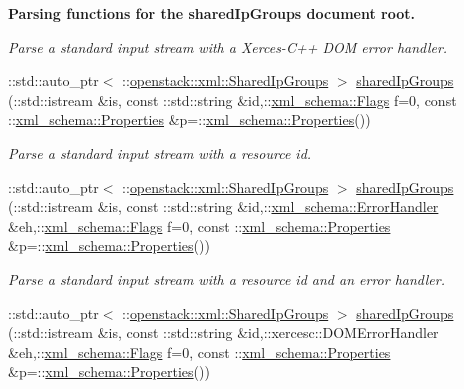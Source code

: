 \begin{Indent}{\bf Parsing functions for the sharedIpGroups document root.}
\begin{DoxyCompactItemize}
\begin{DoxyCompactList}\small\item\em Parse a standard input stream with a Xerces-\/C++ DOM error handler. \item\end{DoxyCompactList}\item 
::std::auto\_\-ptr$<$ ::\hyperlink{classopenstack_1_1xml_1_1SharedIpGroups}{openstack::xml::SharedIpGroups} $>$ \hyperlink{namespaceopenstack_1_1xml_adf667d4ebcb1ed4aa061b80aff868b9d}{sharedIpGroups} (::std::istream \&is, const ::std::string \&id,::\hyperlink{namespacexml__schema_affb4c227cbd9aa7453dd1dc5a1401943}{xml\_\-schema::Flags} f=0, const ::\hyperlink{namespacexml__schema_ad27ce19a7ee1d3b1064092648898f64c}{xml\_\-schema::Properties} \&p=::\hyperlink{namespacexml__schema_ad27ce19a7ee1d3b1064092648898f64c}{xml\_\-schema::Properties}())
\begin{DoxyCompactList}\small\item\em Parse a standard input stream with a resource id. \item\end{DoxyCompactList}\item 
::std::auto\_\-ptr$<$ ::\hyperlink{classopenstack_1_1xml_1_1SharedIpGroups}{openstack::xml::SharedIpGroups} $>$ \hyperlink{namespaceopenstack_1_1xml_a5c9e689b5227791d2881dff02e839877}{sharedIpGroups} (::std::istream \&is, const ::std::string \&id,::\hyperlink{namespacexml__schema_ab1c9361bfd3b404eaabf0c31eded79dc}{xml\_\-schema::ErrorHandler} \&eh,::\hyperlink{namespacexml__schema_affb4c227cbd9aa7453dd1dc5a1401943}{xml\_\-schema::Flags} f=0, const ::\hyperlink{namespacexml__schema_ad27ce19a7ee1d3b1064092648898f64c}{xml\_\-schema::Properties} \&p=::\hyperlink{namespacexml__schema_ad27ce19a7ee1d3b1064092648898f64c}{xml\_\-schema::Properties}())
\begin{DoxyCompactList}\small\item\em Parse a standard input stream with a resource id and an error handler. \item\end{DoxyCompactList}\item 
::std::auto\_\-ptr$<$ ::\hyperlink{classopenstack_1_1xml_1_1SharedIpGroups}{openstack::xml::SharedIpGroups} $>$ \hyperlink{namespaceopenstack_1_1xml_ad241b108ab0299c6183c39f6df49e529}{sharedIpGroups} (::std::istream \&is, const ::std::string \&id,::xercesc::DOMErrorHandler \&eh,::\hyperlink{namespacexml__schema_affb4c227cbd9aa7453dd1dc5a1401943}{xml\_\-schema::Flags} f=0, const ::\hyperlink{namespacexml__schema_ad27ce19a7ee1d3b1064092648898f64c}{xml\_\-schema::Properties} \&p=::\hyperlink{namespacexml__schema_ad27ce19a7ee1d3b1064092648898f64c}{xml\_\-schema::Properties}())

\end{DoxyCompactItemize}
\end{Indent}
